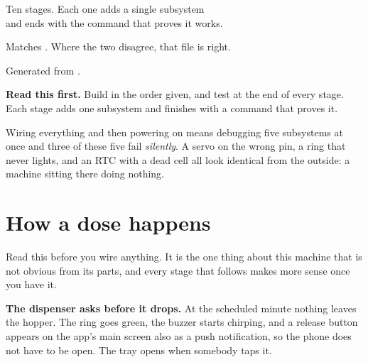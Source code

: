 \documentclass[11pt,a4paper]{article}
\begin{document}
\begin{center}
\begin{tikzpicture}[scale=1.12]
\end{tikzpicture}

\vfill

{\sffamily\small\color{ink70}
 Ten stages. Each one adds a single subsystem\\
 and ends with the command that proves it works.}

\vspace{10mm}
{\sffamily\footnotesize\color{ink40}
 Matches . Where the two disagree, that file is right.\par
 Generated from .}
\vspace{4mm}
\end{center}

\clearpage

\tableofcontents
\vspace{4mm}

\begin{notebox}
\textbf{\sffamily Read this first.} Build in the order given, and test at the end
of every stage. Each stage adds one subsystem and finishes with a command that
proves it.

\vspace{1ex}
Wiring everything and then powering on means debugging five subsystems at once
\textemdash{} and three of these five fail \emph{silently}. A servo on the wrong
pin, a ring that never lights, and an RTC with a dead cell all look identical
from the outside: a machine sitting there doing nothing.
\end{notebox}

\clearpage
{}

\section{How a dose happens}
\label{sec:model}

Read this before you wire anything. It is the one thing about this machine that
is not obvious from its parts, and every stage that follows makes more sense
once you have it.

\vspace{1mm}
\noindent\textbf{\sffamily The dispenser asks before it drops.} At the scheduled
minute nothing leaves the hopper. The ring goes green, the buzzer starts
chirping, and a release button appears on the app's main screen \textemdash{}
also as a push notification, so the phone does not have to be open. The tray
opens when somebody taps it.
\end{document}
